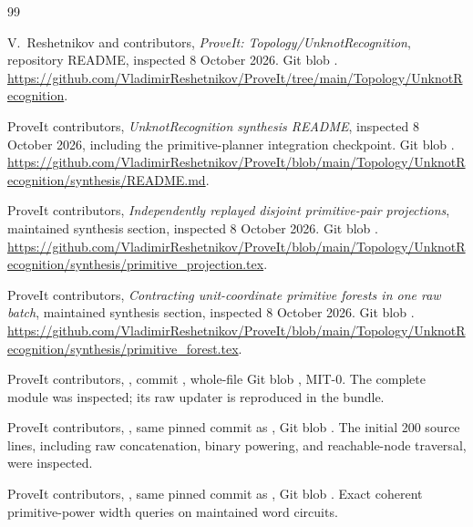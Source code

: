 \documentclass[11pt,letterpaper]{article}
\theoremstyle{definition}
\theoremstyle{remark}\newtheorem{remark}[theorem]{Remark}
\begin{document}
\begin{thebibliography}{99}
\small\raggedright

V.~Reshetnikov and contributors,
\emph{ProveIt: Topology/UnknotRecognition}, repository README, inspected
8 October 2026. Git blob
.
\url{https://github.com/VladimirReshetnikov/ProveIt/tree/main/Topology/UnknotRecognition}.

ProveIt contributors, \emph{UnknotRecognition synthesis README}, inspected
8 October 2026, including the primitive-planner integration checkpoint.
Git blob .
\url{https://github.com/VladimirReshetnikov/ProveIt/blob/main/Topology/UnknotRecognition/synthesis/README.md}.

ProveIt contributors, \emph{Independently replayed disjoint primitive-pair
projections}, maintained synthesis section, inspected 8 October 2026.
Git blob .
\url{https://github.com/VladimirReshetnikov/ProveIt/blob/main/Topology/UnknotRecognition/synthesis/primitive_projection.tex}.

ProveIt contributors, \emph{Contracting unit-coordinate primitive forests in
one raw batch}, maintained synthesis section, inspected 8 October 2026.
Git blob .
\url{https://github.com/VladimirReshetnikov/ProveIt/blob/main/Topology/UnknotRecognition/synthesis/primitive_forest.tex}.

ProveIt contributors, ,
commit ,
whole-file Git blob , MIT-0.
The complete module was inspected; its raw updater is reproduced in the bundle.

ProveIt contributors, ,
same pinned commit as \cite{repo-code}, Git blob
.
The initial 200 source lines, including raw concatenation, binary powering,
and reachable-node traversal, were inspected.

ProveIt contributors, ,
same pinned commit as \cite{repo-code}, Git blob
.
Exact coherent primitive-power width queries on maintained word circuits.


\end{thebibliography}
\end{document}
